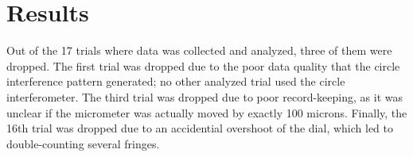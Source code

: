 \documentclass{article}
\begin{document}
\bigskip



\section*{Results}
Out of the 17 trials where data was collected and analyzed, three of them were dropped. The first trial was dropped due to the poor data quality that the circle interference pattern generated; no other analyzed trial used the circle interferometer. The third trial was dropped due to poor record-keeping, as it was unclear if the micrometer was actually moved by exactly 100 microns. Finally, the 16th trial was dropped due to an accidential overshoot of the dial, which led to double-counting several fringes. 
\end{document}
